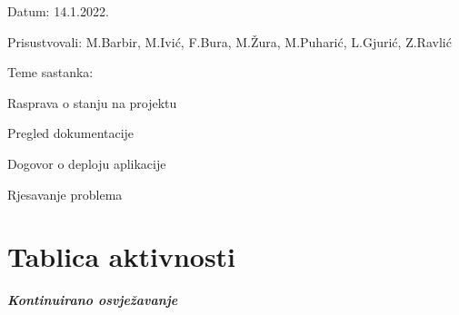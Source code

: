 \begin{packed_enum}
\begin{packed_item}
	\item Datum: 14.1.2022.
	\item Prisustvovali: M.Barbir, M.Ivić, F.Bura, M.Žura, M.Puharić, L.Gjurić, Z.Ravlić
	\item Teme sastanka:
	\begin{packed_item}
		\item  Rasprava o stanju na projektu
		\item  Pregled dokumentacije
		\item  Dogovor o deploju aplikacije 
		\item  Rjesavanje problema
	\end{packed_item}
\end{packed_item}
			
		\end{packed_enum}
		
		\eject
		\section*{Tablica aktivnosti}
		
			\textbf{\textit{Kontinuirano osvježavanje}}\\
			

